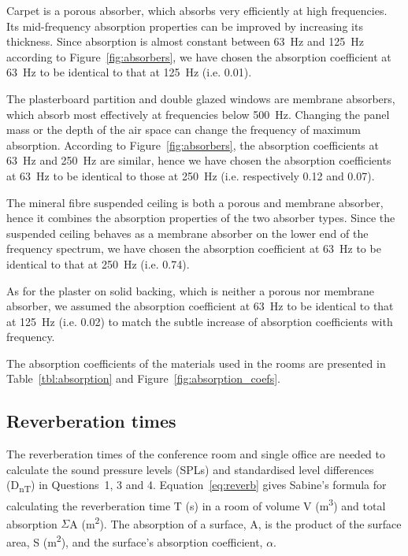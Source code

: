 

Carpet is a porous absorber, which absorbs very efficiently at high frequencies.
Its mid-frequency absorption properties can be improved by increasing its thickness.
Since absorption is almost constant between 63~Hz and 125~Hz according to Figure~\ref{fig:absorbers}, we have chosen the absorption coefficient at 63~Hz to be identical to that at 125~Hz (i.e. 0.01).

The plasterboard partition and double glazed windows are membrane absorbers, which absorb most effectively at frequencies below 500~Hz.
Changing the panel mass or the depth of the air space can change the frequency of maximum absorption.
According to Figure~\ref{fig:absorbers}, the absorption coefficients at 63~Hz and 250~Hz are similar, hence we have chosen the absorption coefficients at 63~Hz to be identical to those at 250~Hz (i.e. respectively 0.12 and 0.07).

The mineral fibre suspended ceiling is both a porous and membrane absorber, hence it combines the absorption properties of the two absorber types.
Since the suspended ceiling behaves as a membrane absorber on the lower end of the frequency spectrum, we have chosen the absorption coefficient at 63~Hz to be identical to that at 250~Hz (i.e. 0.74).

As for the plaster on solid backing, which is neither a porous nor membrane absorber, we assumed the absorption coefficient at 63~Hz to be identical to that at 125~Hz (i.e. 0.02) to match the subtle increase of absorption coefficients with frequency.

The absorption coefficients of the materials used in the rooms are presented in Table~\ref{tbl:absorption} and Figure~\ref{fig:absorption_coefs}.





\subsection{Reverberation times}

The reverberation times of the conference room and single office are needed to calculate the sound pressure levels (SPLs) and standardised level differences (D\textsubscript{nT}) in Questions~1, 3 and 4.
Equation~\ref{eq:reverb} gives Sabine's formula for calculating the reverberation time T (s) in a room of volume V (m\textsuperscript{3}) and total absorption $\Sigma$A (m\textsuperscript{2}).
The absorption of a surface, A, is the product of the surface area, S (m\textsuperscript{2}), and the surface's absorption coefficient, $\alpha$.

